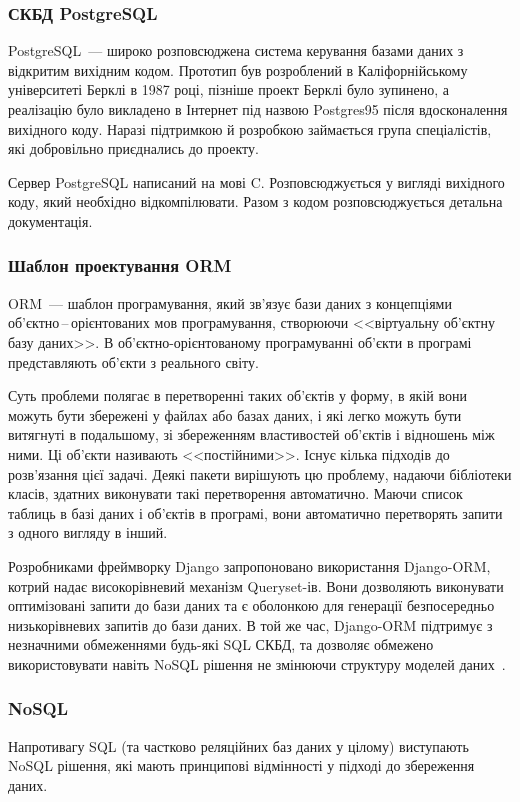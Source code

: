\subsubsection{СКБД PostgreSQL}

PostgreSQL~--- широко розповсюджена система керування базами даних з відкритим вихідним кодом. Прототип був розроблений в Каліфорнійському університеті Берклі в 1987 році, пізніше проект Берклі було зупинено, а реалізацію було викладено в Інтернет під назвою Postgres95 після вдосконалення вихідного коду. Наразі підтримкою й розробкою займається група спеціалістів, які добровільно приєднались до проекту.

Сервер PostgreSQL написаний на мові C. Розповсюджується у вигляді вихідного коду, який необхідно відкомпілювати. Разом з кодом розповсюджується детальна документація.

\subsubsection{Шаблон проектування ORM} \label{subs:orm}

ORM~--- шаблон програмування, який зв'язує бази даних з концепціями об'єктно\,--\,орієнтованих мов програмування, створюючи <<віртуальну об'єктну базу даних>>. В об'єктно-орієнтованому програмуванні об'єкти в програмі представляють об'єкти з реального світу. 

Суть проблеми полягає в перетворенні таких об'єктів у форму, в якій вони можуть бути збережені у файлах або базах даних, і які легко можуть бути витягнуті в подальшому, зі збереженням властивостей об'єктів і відношень між ними. Ці об'єкти називають <<постійними>>. Існує кілька підходів до розв'язання цієї задачі. Деякі пакети вирішують цю проблему, надаючи бібліотеки класів, здатних виконувати такі перетворення автоматично. Маючи список таблиць в базі даних і об'єктів в програмі, вони автоматично перетворять запити з одного вигляду в інший.

Розробниками фреймворку Django запропоновано використання Django-ORM, котрий надає високорівневий механізм Queryset-ів. Вони дозволяють виконувати оптимізовані запити до бази даних та є оболонкою для генерації безпосередньо низькорівневих запитів до бази даних. В той же час, Django-ORM підтримує з незначними обмеженнями будь-які SQL СКБД, та дозволяє обмежено використовувати навіть NoSQL рішення не змінюючи структуру моделей даних~\cite{rubio2017rest}.

\subsubsection{NoSQL}
Напротивагу SQL (та частково реляційних баз даних у цілому) виступають NoSQL рішення, які мають принципові відмінності у підході до збереження даних.


